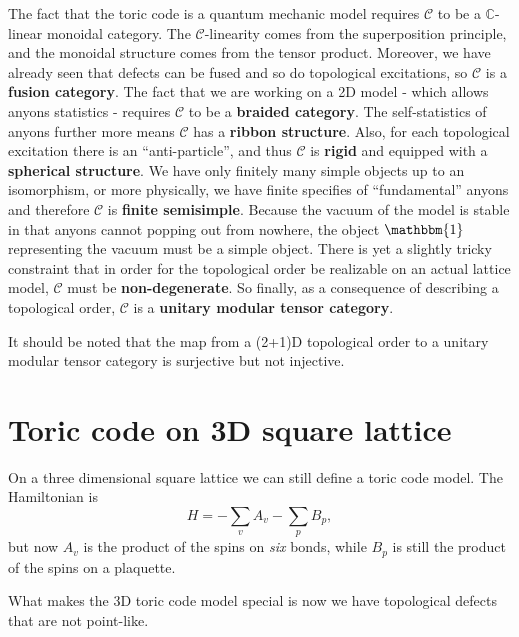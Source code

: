 \documentclass[hyperref, a4paper]{article}
\newcommand*{\concept}[1]{{\textbf{#1}}}
\begin{document}
The fact that the toric code is a quantum mechanic model requires $\mathcal{C}$ to be a $\mathbb{C}$-linear monoidal category.
The $\mathcal{C}$-linearity comes from the superposition principle, and the monoidal structure comes from the tensor product.
Moreover, we have already seen that defects can be fused and so do topological excitations, so $\mathcal{C}$ is a \concept{fusion category}.
The fact that we are working on a 2D model - which allows anyons statistics - requires $\mathcal{C}$ to be a \concept{braided category}.
The self-statistics of anyons further more means $\mathcal{C}$ has a \concept{ribbon structure}.
Also, for each topological excitation there is an ``anti-particle'', and thus $\mathcal{C}$ is \concept{rigid} and equipped with a \concept{spherical structure}.
We have only finitely many simple objects up to an isomorphism, or more physically, we have finite specifies of ``fundamental'' anyons and therefore $\mathcal{C}$ is \concept{finite semisimple}.
Because the vacuum of the model is stable in that anyons cannot popping out from nowhere, the object $\mathbbm{1}$ representing the vacuum must be a simple object.
There is yet a slightly tricky constraint that in order for the topological order be realizable on an actual lattice model, $\mathcal{C}$ must be \concept{non-degenerate}. %
So finally, as a consequence of describing a topological order, $\mathcal{C}$ is a \concept{unitary modular tensor category}.

It should be noted that the map from a (2+1)D topological order to a unitary modular tensor category is surjective but not injective.

\section{Toric code on 3D square lattice}

On a three dimensional square lattice we can still define a toric code model. The Hamiltonian is 
\begin{equation}
    H = - \sum_v A_v - \sum_p B_p,
\end{equation}
but now $A_v$ is the product of the spins on \emph{six} bonds, while $B_p$ is still the product of the spins on a plaquette.

What makes the 3D toric code model special is now we have topological defects that are not point-like.
\end{document}

